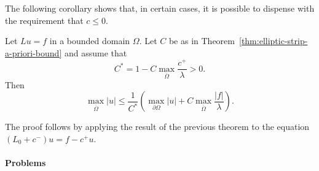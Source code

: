 The following corollary shows that, in certain cases, it is possible to dispense with the requirement that $c\leq0$.

\begin{Corollary}
\label{cor:elliptic-small-positive-zero-order}
Let $Lu=f$ in a bounded domain $\Omega$. Let $C$ be as in Theorem~\ref{thm:elliptic-strip-a-priori-bound} and assume that
\begin{equation}\label{eq:elliptic-positive-zero-order-smallness}
C^*=1-C\max_{\overline\Omega}\dfrac{c^+}{\lambda}>0.
\end{equation}
Then
\begin{equation}\label{eq:elliptic-small-positive-zero-order-bound}
\max_{\overline\Omega}|u|\leq\dfrac1{C^*}\left(\max_{\partial\Omega}|u|+C\max_{\overline\Omega}\dfrac{|f|}{\lambda}\right).
\end{equation}

\end{Corollary}

The proof follows by applying the result of the previous theorem to the equation $(L_0+c^-)u=f-c^+u$.

\paragraph*{Problems}

